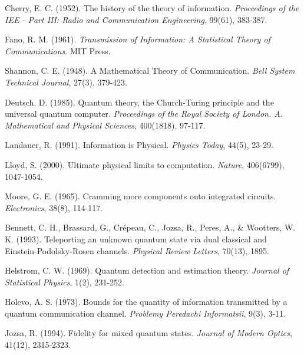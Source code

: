 \documentclass[11pt,a4paper,spanish]{book}
\begin{document}
\begin{thebibliography}{}


Cherry, E. C. (1952). The history of the theory of information. \emph{Proceedings of the IEE - Part III: Radio and Communication Engineering}, 99(61), 383-387.

Fano, R. M. (1961). \emph{Transmission of Information: A Statistical Theory of Communications}. MIT Press.

Shannon, C. E. (1948). A Mathematical Theory of Communication. \emph{Bell System Technical Journal}, 27(3), 379-423.



Deutsch, D. (1985). Quantum theory, the Church-Turing principle and the universal quantum computer. \emph{Proceedings of the Royal Society of London. A. Mathematical and Physical Sciences}, 400(1818), 97-117.

Landauer, R. (1991). Information is Physical. \emph{Physics Today}, 44(5), 23-29.

Lloyd, S. (2000). Ultimate physical limits to computation. \emph{Nature}, 406(6799), 1047-1054.

Moore, G. E. (1965). Cramming more components onto integrated circuits. \emph{Electronics}, 38(8), 114-117.


Bennett, C. H., Brassard, G., Crépeau, C., Jozsa, R., Peres, A., \& Wootters, W. K. (1993). Teleporting an unknown quantum state via dual classical and Einstein-Podolsky-Rosen channels. \emph{Physical Review Letters}, 70(13), 1895.

Helstrom, C. W. (1969). Quantum detection and estimation theory. \emph{Journal of Statistical Physics}, 1(2), 231-252.

Holevo, A. S. (1973). Bounds for the quantity of information transmitted by a quantum communication channel. \emph{Problemy Peredachi Informatsii}, 9(3), 3-11.

Jozsa, R. (1994). Fidelity for mixed quantum states. \emph{Journal of Modern Optics}, 41(12), 2315-2323.


\end{thebibliography}
\end{document}

